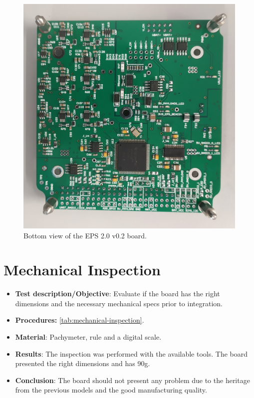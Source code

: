 \begin{figure}[!ht]
    \begin{center}
        \includegraphics[width=\columnwidth]{figures/v02/eps2-v02-bottom.jpg}
        \caption{Bottom view of the EPS 2.0 v0.2 board.}
        \label{fig:eps2-v01-bottom}
    \end{center}
\end{figure}

\newpage

\section{Mechanical Inspection}

\begin{itemize}
    \item \textbf{Test description/Objective}: Evaluate if the board has the right dimensions and the necessary mechanical specs prior to integration.
    \item \textbf{Procedures:} \autoref{tab:mechanical-inspection}.
    \item \textbf{Material}: Pachymeter, rule and a digital scale.
    \item \textbf{Results}: The inspection was performed with the available tools. The board presented the right dimensions and has 90g.
    \item \textbf{Conclusion}: The board should not present any problem due to the heritage from the previous models and the good manufacturing quality.
\end{itemize}


